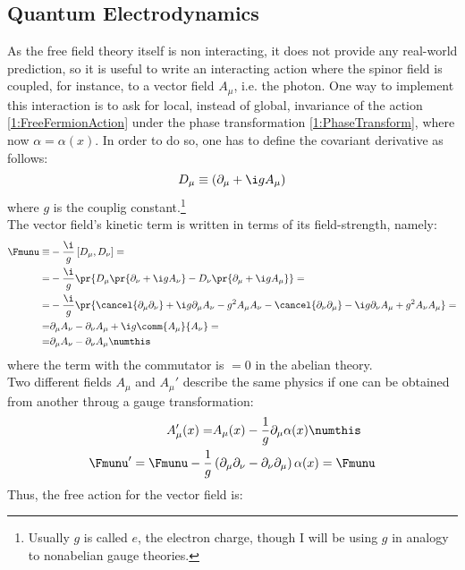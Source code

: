 \subsection{Quantum Electrodynamics}
As the free field theory itself is non interacting, it does not provide any real-world prediction, so it is useful to write an interacting action where the spinor field is coupled, for instance, to a vector field $A_\mu$, i.e. the photon.
One way to implement this interaction is to ask for local, instead of global, invariance of the action \eqref{1:FreeFermionAction} under the phase transformation \eqref{1:PhaseTransform}, where now $\alpha=\alpha(x)$.
In order to do so, one has to define the covariant derivative as follows:
\begin{equation}
    D_\mu \equiv \left( \partial_\mu+\i g A_\mu \right) \label{1:CovDeriv}
\end{equation}
where $g$ is the couplig constant.\footnote{Usually $g$ is called $e$, the electron charge, though I will be using $g$ in analogy to nonabelian gauge theories.}\\
The vector field's kinetic term is written in terms of its field-strength, namely:
\begin{align*}
    \Fmunu\equiv& -\frac{\i}{g}\left[D_\mu,D_\nu\right] = \\
    =& -\frac{\i}{g}\pr{D_\mu\pr{\partial_\nu+\i g A_\nu} - D_\nu\pr{\partial_\mu+\i g A_\mu}}=\\
    =& -\frac{\i}{g}\pr{\cancel{\partial_\mu\partial_\nu} + \i g\partial_\mu A_\nu -g^2A_\mu A_\nu - \cancel{\partial_\nu\partial_\mu} - \i g\partial_\nu A_\mu + g^2A_\nu A_\mu}=\\
    =& \partial_\mu A_\nu - \partial_\nu A_\mu + \i g\comm{A_\mu}{A_\nu}=\\
    =& \partial_\mu A_\nu - \partial_\nu A_\mu \numthis\label{1:FieldStrU1}
\end{align*}
where the term with the commutator is $=0$ in the abelian theory.\\
Two different fields $A_\mu$ and $A_\mu'$ describe the same physics if one can be obtained from another throug a gauge transformation:
\begin{align*}
    A_\mu'(x) =& A_\mu(x) - \frac1g \partial_\mu\alpha(x) \numthis\label{1:GaugeTransf} \\
    \Fmunu' = \Fmunu - \frac1g&\left( \partial_\mu\partial_\nu-\partial_\nu\partial_\mu \right)\alpha(x) = \Fmunu
\end{align*}
Thus, the free action for the vector field is:
